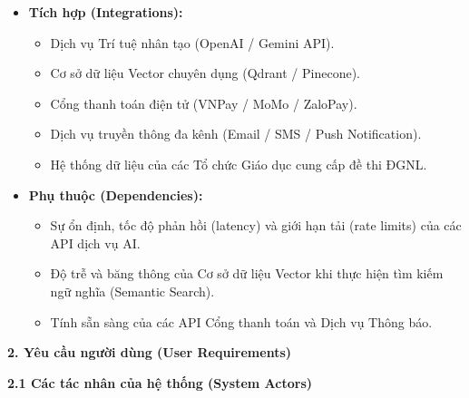 \begin{itemize}
	\item \textbf{Tích hợp (Integrations):}
	\begin{itemize}
		\item Dịch vụ Trí tuệ nhân tạo (OpenAI / Gemini API).
		\item Cơ sở dữ liệu Vector chuyên dụng (Qdrant / Pinecone).
		\item Cổng thanh toán điện tử (VNPay / MoMo / ZaloPay).
		\item Dịch vụ truyền thông đa kênh (Email / SMS / Push Notification).
		\item Hệ thống dữ liệu của các Tổ chức Giáo dục cung cấp đề thi ĐGNL.
	\end{itemize}
	
	\item \textbf{Phụ thuộc (Dependencies):}
	\begin{itemize}
		\item Sự ổn định, tốc độ phản hồi (latency) và giới hạn tải (rate limits) của các API dịch vụ AI.
		\item Độ trễ và băng thông của Cơ sở dữ liệu Vector khi thực hiện tìm kiếm ngữ nghĩa (Semantic Search).
		\item Tính sẵn sàng của các API Cổng thanh toán và Dịch vụ Thông báo.
	\end{itemize}
\end{itemize}

\newpage

{\Large \textbf{2. Yêu cầu người dùng (User Requirements)}}

\vspace{0.3cm}

{\large \textbf{2.1 Các tác nhân của hệ thống (System Actors)}}

\vspace{0.3cm}

